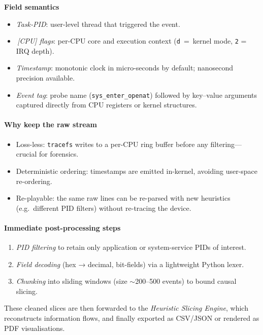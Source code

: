 \documentclass[a4paper,12pt]{report}
\begin{document}
\noindent
\textbf{Field semantics}
\begin{itemize}
  \item \textit{Task‐PID}: user-level thread that triggered the event.
  \item \textit{\,[CPU] flags}: per-CPU core and execution context (\texttt{d}~=~kernel mode, \texttt{2} = IRQ depth).
  \item \textit{Timestamp}: monotonic clock in micro-seconds by default; nanosecond precision available.
  \item \textit{Event tag}: probe name (\texttt{sys\_enter\_openat}) followed by key–value arguments captured directly from CPU registers or kernel structures.
\end{itemize}

\paragraph{Why keep the raw stream}
\begin{itemize}
  \item Loss-less: \texttt{tracefs} writes to a per-CPU ring buffer before any filtering—crucial for forensics.
  \item Deterministic ordering: timestamps are emitted in-kernel, avoiding user-space re-ordering.
  \item Re-playable: the same raw lines can be re-parsed with new heuristics (e.g.\ different PID filters) without re-tracing the device.
\end{itemize}

\paragraph{Immediate post-processing steps}
\begin{enumerate}[label=(\roman*)]
  \item \emph{PID filtering} to retain only application or system-service PIDs of interest.
  \item \emph{Field decoding} (hex → decimal, bit-fields) via a lightweight Python lexer.
  \item \emph{Chunking} into sliding windows (size $\sim$200–500 events) to bound causal slicing.
\end{enumerate}

\noindent
These cleaned slices are then forwarded to the \textit{Heuristic Slicing Engine}, which reconstructs information flows, and finally exported as CSV/JSON or rendered as PDF visualisations.
\end{document}

